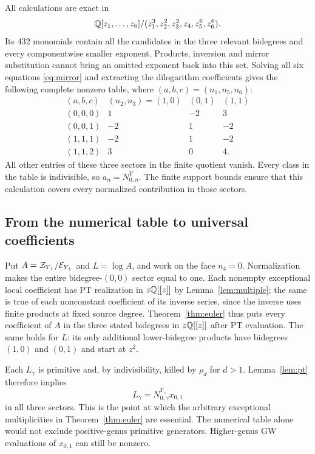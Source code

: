 All calculations are exact in
\[
 \mathbb Q[z_1,\ldots,z_6]/(z_1^3,z_2^2,z_3^2,z_4,z_5^6,z_6^6).
\]
Its 432 monomials contain all the candidates in the three relevant
bidegrees and every componentwise smaller exponent. Products,
inversion and mirror substitution cannot bring an omitted exponent
back into this set. Solving all six equations \eqref{eq:mirror}
and extracting the dilogarithm coefficients gives the following
complete nonzero table, where $(a,b,c)=(n_1,n_5,n_6)$:
\begin{equation}\label{eq:gwtable}
\begin{array}{c|rrr}
(a,b,c)&(n_2,n_3)=(1,0)&(0,1)&(1,1)\\ \hline
(0,0,0)&1&-2&3\\
(0,0,1)&-2&1&-2\\
(1,1,1)&-2&1&-2\\
(1,1,2)&3&0&4.
\end{array}
\end{equation}
All other entries of these three sectors in the finite quotient
vanish. Every class in the table is indivisible, so $a_n=N^Y_{0,n}$.
The finite support bounds ensure that this calculation covers every
normalized contribution in those sectors.

\subsection{From the numerical table to universal coefficients}
Put $A=\mathcal Z_{Y_+}/\mathcal E_{Y_+}$ and $L=\log A$, and work on the face
$n_4=0$. Normalization makes the entire bidegree-$(0,0)$ sector
equal to one. Each nonempty exceptional local coefficient has PT
realization in $z\mathbb Q[[z]]$ by Lemma~\ref{lem:multiple}; the same is
true of each nonconstant coefficient of its inverse series, since
the inverse uses finite products at fixed source degree.
Theorem~\ref{thm:euler} thus puts every coefficient of $A$ in the
three stated bidegrees in $z\mathbb Q[[z]]$ after PT evaluation.
The same holds for $L$: its only additional lower-bidegree products
have bidegrees $(1,0)$ and $(0,1)$ and start at $z^2$.

Each $L_\gamma$ is primitive and, by indivisibility, killed by
$\rho_d$ for $d>1$. Lemma~\ref{lem:pt} therefore implies
\begin{equation}\label{eq:logcoeff}
 L_\gamma=N^{Y_+}_{0,\gamma}x_{0,1}
\end{equation}
in all three sectors. This is the point at which the arbitrary
exceptional multiplicities in Theorem~\ref{thm:euler} are essential.
The numerical table alone would not exclude positive-genus primitive
generators. Higher-genus GW evaluations of $x_{0,1}$ can still be
nonzero.


